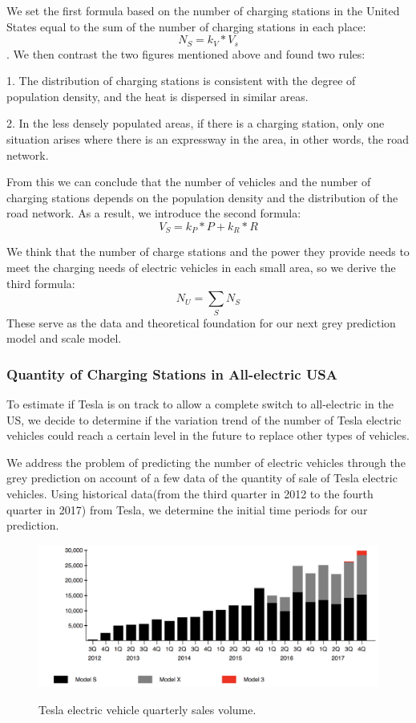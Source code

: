\documentclass{mcmthesis}
\begin{document}
We set the first formula based on the number of charging stations in the United States equal to the sum of the number of charging stations in each place: \begin{equation}
N_S = k_V*V_s
\end{equation}. We then contrast the two figures mentioned above and found two rules: 
\par
1. The distribution of charging stations is consistent with the degree of population density, and the heat is dispersed in similar areas. 
\par
2. In the less densely populated areas, if there is a charging station, only one situation arises where there is an expressway in the area, in other words, the road network. 
\par 
From this we can conclude that the number of vehicles and the number of charging stations depends on the population density and the distribution of the road network. As a result, we introduce the second formula:
\begin{equation}
V_S=k_P*P+k_R*R
\end{equation}


\par
We think that the number of charge stations and the power they provide needs to meet the charging needs of electric vehicles in each small area, so we derive the third formula:
\begin{equation}
N_U = \sum_{S}N_S 
\end{equation}
These serve as the data and theoretical foundation for our next grey prediction model and scale model.
		\subsubsection{Quantity of Charging Stations in All-electric USA}
		To estimate if Tesla is on track to allow a complete switch to all-electric in the US, we decide to determine if the variation trend of the number of Tesla electric vehicles could reach a certain level in the future to replace other types of vehicles.
		\par
We address the problem of predicting the number of electric vehicles through the grey prediction on account of a few data of the quantity of sale of Tesla electric vehicles. Using historical data(from the third quarter in 2012 to the fourth quarter in 2017) from Tesla, we determine the initial time periods for our prediction.
\begin{figure}[htbp]
	\centering
	\includegraphics[width=15cm]{img/tsl.png}\\
	\caption{Tesla electric vehicle quarterly sales volume.}
	\label{Figure3}
\end{figure}
\end{document}
